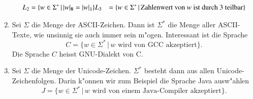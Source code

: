 \begin{enumerate}
\begin{align*}
L_2&=\{ w\in\Sigma^*\,|\, |w|_{\tt 0}=|w|_{\tt 1}\}
L_3&=\{ w\in\Sigma^*\,|\, \text{Zahlenwert von $w$ ist durch 3 teilbar}\}
\end{align*}
\item Sei $\Sigma$ die Menge der ASCII-Zeichen. Dann ist $\Sigma^*$ die
Menge aller ASCII-Texte, wie unsinnig sie auch immer sein m"ogen. Interessant
ist die Sprache
\[
C=\{w\in\Sigma^*\,|\,\text{$w$ wird von GCC akzeptiert}\}.
\]
Die Sprache $C$ heisst GNU-Dialekt von C.
\item Sei $\Sigma$ die Menge der Unicode-Zeichen. $\Sigma^*$ besteht
dann aus allen Unicode-Zeichenfolgen. Darin k"onnen wir zum Beispiel die
Sprache Java ausw"ahlen
\[
J
=\{w\in\Sigma^*\,|\, {\text{$w$ wird von einem Java-Compiler akzeptiert}}\}.
\]
\end{enumerate}
